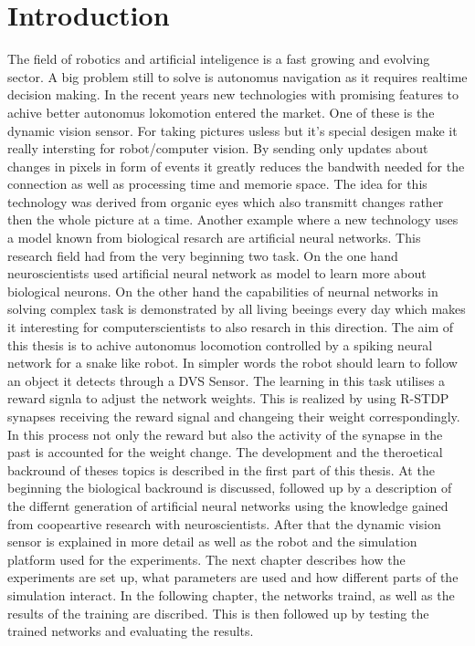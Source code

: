 
\chapter{Introduction}\label{chapter:introduction}
The field of robotics and artificial inteligence is a fast growing and evolving sector. 
A big problem still to solve is autonomus navigation as it requires realtime decision making. In the recent years new technologies with promising features to achive better autonomus lokomotion entered the market. One of these is the dynamic vision sensor. For taking pictures usless but it's special desigen make it really intersting for robot/computer vision. By sending only updates about changes in pixels in form of events it greatly reduces the bandwith needed for the connection as well as processing time and memorie space. The idea for this technology was derived from organic eyes which also transmitt changes rather then the whole picture at a time.
\newline
Another example where a new technology uses a model known from biological resarch are artificial neural networks. This research field had from the very beginning two task. On the one hand neuroscientists used artificial neural network as model to learn more about biological neurons. On the other hand the capabilities of neurnal networks in solving complex task is demonstrated by all living beeings every day which makes it interesting for computerscientists to also resarch in this direction.
The aim of this thesis is to achive autonomus locomotion controlled by a spiking neural network for a snake like robot. In simpler words the robot should learn to follow an object it detects through a DVS Sensor. The learning in this task utilises a reward signla to adjust the network weights. This is realized by using R-STDP synapses receiving the reward signal and changeing their weight correspondingly. In this process not only the reward but also the activity of the synapse in the past is accounted for the weight change.
The development and the theroetical backround of theses topics is described in the first part of this thesis. At the beginning the biological backround is discussed, followed up by a description of the differnt generation of artificial neural networks using the knowledge gained from coopeartive research with neuroscientists. After that the dynamic vision sensor is explained in more detail as well as the robot and the simulation platform used for the experiments. The next chapter describes how the experiments are set up, what parameters are used and how different parts of the simulation interact.
In the following chapter, the networks traind, as well as the results of the training are 
discribed. This is then followed up by testing the trained networks and evaluating the results.